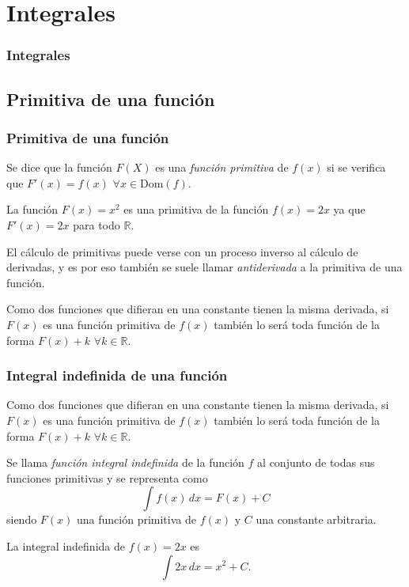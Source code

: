 

\section{Integrales}
\begin{frame}
\frametitle{Integrales}
\tableofcontents[sectionstyle=show/hide,hideothersubsections]
\end{frame}



\subsection{Primitiva de una función}
\begin{frame}
\frametitle{Primitiva de una función}
\begin{definicion}
Se dice que la función $F(X)$ es una \emph{función primitiva} de $f(x)$ si se verifica que $F'(x)=f(x)$ $\forall x \in \textrm{Dom}(f)$.
\end{definicion}
 La función $F(x)=x^2$ es una primitiva de la función $f(x)=2x$ ya que $F'(x)=2x$ para todo $\mathbb{R}$.

El cálculo de primitivas puede verse con un proceso inverso al cálculo de derivadas, y es por eso también se suele llamar \emph{antiderivada} a la primitiva de una función.

Como dos funciones que difieran en una constante tienen la misma derivada, si $F(x)$ es una función primitiva de $f(x)$
también lo será toda función de la forma $F(x)+k$ $\forall k \in \mathbb{R}$. 
\end{frame}


\begin{frame}
\frametitle{Integral indefinida de una función}
Como dos funciones que difieran en una constante tienen la misma derivada, si $F(x)$ es una función primitiva de $f(x)$ también lo será toda función de la forma $F(x)+k$ $\forall k \in \mathbb{R}$.

\begin{definicion}
Se llama \emph{función integral indefinida} de la función $f$ al conjunto de todas sus funciones primitivas y se representa como
\[
\int{f(x)}\,dx=F(x)+C
\]
siendo $F(x)$ una función primitiva de $f(x)$ y $C$ una constante arbitraria.
\end{definicion}

 La integral indefinida de $f(x)=2x$ es
\[\int 2x\, dx = x^2+C.\]
\end{frame}


